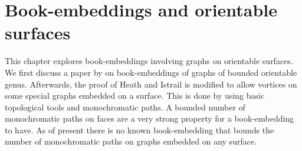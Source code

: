 \chapter{Book-embeddings and orientable surfaces}\label{chap:orientable}

This chapter explores book-embeddings involving graphs on orientable surfaces. We first discuss a paper by \textcite{heathPagenumberGenusGraphs1992} on book-embeddings of graphs of bounded orientable genus. Afterwards, the proof of Heath and Istrail is modified to allow vortices on some special graphs embedded on a surface. This is done by using basic topological tools and monochromatic paths. A bounded number of monochromatic paths on faces are a very strong property for a book-embedding to have. As of present there is no known book-embedding that bounds the number of monochromatic paths on graphs embedded on any surface.



%
